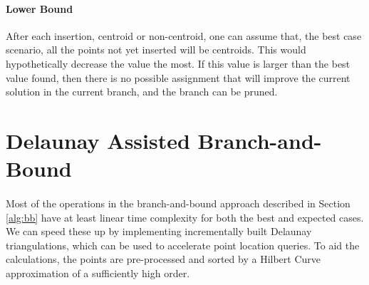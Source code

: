 \paragraph{Lower Bound}
After each insertion, centroid or non-centroid, one can assume that, the best case scenario, all the points not yet inserted will be centroids. This would hypothetically decrease the value the most. If this value is larger than the best value found, then there is no possible assignment that will improve the current solution in the current branch, and the branch can be pruned.
\paragraph{}
\section{Delaunay Assisted Branch-and-Bound}
\label{alg:da}
\paragraph{}
Most of the operations in the branch-and-bound approach described in Section \ref{alg:bb} have at least linear time complexity for both the best and expected cases. We can speed these up by implementing incrementally built Delaunay triangulations, which can be used to accelerate point location queries. To aid the calculations, the points are pre-processed and sorted by a Hilbert Curve approximation of a sufficiently high order.

